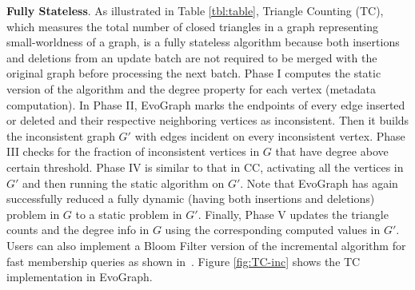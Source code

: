 \textbf{Fully Stateless}. As illustrated in Table \ref{tbl:table}, Triangle Counting (TC), which measures the total number of closed triangles in a graph representing small-worldness of a graph, is a fully stateless algorithm because both insertions and deletions from an update batch are not required to be merged with the original graph before processing the next batch. Phase I computes the static version of the algorithm and the degree property for each vertex (metadata computation). In Phase II, EvoGraph marks the endpoints of every edge inserted or deleted and their respective neighboring vertices as inconsistent. Then it builds the inconsistent graph $G'$ with edges incident on every inconsistent vertex. Phase III checks for the fraction of inconsistent vertices in $G$ that have degree above certain threshold. Phase IV is similar to that in CC, activating all the vertices in $G'$ and then running the static algorithm on $G'$. Note that EvoGraph has again successfully reduced a fully dynamic (having both insertions and deletions) problem in $G$ to a static problem in $G'$. Finally, Phase V updates the triangle counts and the degree info in $G$ using the corresponding computed values in $G'$. Users can also implement a Bloom Filter version of the incremental algorithm for fast membership queries as shown in~\cite{CCof}. Figure \ref{fig:TC-inc} shows the TC implementation in EvoGraph.


